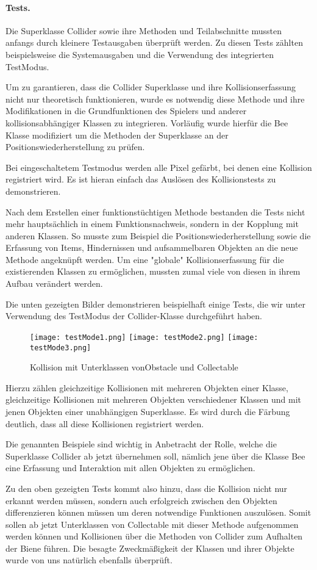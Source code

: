 \documentclass{pi1}
\begin{document}
\paragraph{Tests.}
Die Superklasse Collider  sowie ihre Methoden und Teilabschnitte mussten anfangs durch kleinere Testausgaben überprüft werden. Zu diesen Tests zählten beispielsweise die Systemausgaben und die Verwendung des integrierten TestModus.

Um zu garantieren, dass die Collider Superklasse und ihre Kollisionserfassung nicht nur theoretisch funktionieren, wurde es notwendig diese Methode und ihre Modifikationen in die Grundfunktionen des Spielers und anderer kollisionsabhängiger Klassen zu integrieren. Vorläufig wurde hierfür die Bee Klasse modifiziert um die Methoden der Superklasse an der Positionswiederherstellung zu prüfen.

Bei eingeschaltetem Testmodus werden alle Pixel gefärbt, bei denen eine Kollision registriert wird.
Es ist hieran einfach das Auslösen des Kollisionstests zu demonstrieren.

Nach dem Erstellen einer funktionstüchtigen Methode bestanden die Tests nicht mehr hauptsächlich in einem Funktionsnachweis, sondern in der Kopplung mit anderen Klassen. So musste zum Beispiel die Positionswiederherstellung sowie die Erfassung von Items, Hindernissen und aufsammelbaren Objekten an die neue Methode angeknüpft werden.
Um eine "globale" Kollisionserfassung für die existierenden Klassen zu ermöglichen, mussten zumal viele von diesen in ihrem Aufbau verändert werden.

Die unten gezeigten Bilder demonstrieren beispielhaft einige Tests, die wir unter Verwendung des TestModus der Collider-Klasse durchgeführt haben.

\begin{figure}[h]
	\texttt{[image: testMode1.png]}
	\texttt{[image: testMode2.png]}
	\texttt{[image: testMode3.png]}
	\caption{Kollision mit Unterklassen vonObstacle und Collectable}
	\label{bild1}
\end{figure}



Hierzu zählen gleichzeitige Kollisionen mit mehreren Objekten einer Klasse, gleichzeitige Kollisionen mit mehreren Objekten verschiedener Klassen und mit jenen Objekten einer unabhängigen Superklasse.
Es wird durch die Färbung deutlich, dass all diese Kollisionen registriert werden.


Die genannten Beispiele sind wichtig in Anbetracht der Rolle, welche die Superklasse Collider ab jetzt übernehmen soll, nämlich jene über die Klasse Bee eine Erfassung und Interaktion mit allen Objekten zu ermöglichen.\newline

Zu den oben gezeigten Tests kommt also hinzu, dass die Kollision nicht nur erkannt werden müssen, sondern auch erfolgreich zwischen den Objekten differenzieren können müssen um deren notwendige Funktionen auszulösen.
Somit sollen ab jetzt Unterklassen von Collectable mit dieser Methode aufgenommen werden können und Kollisionen über die Methoden von Collider zum Aufhalten der Biene führen.
Die besagte Zweckmäßigkeit der Klassen und ihrer Objekte wurde von uns natürlich ebenfalls überprüft.
\end{document}
